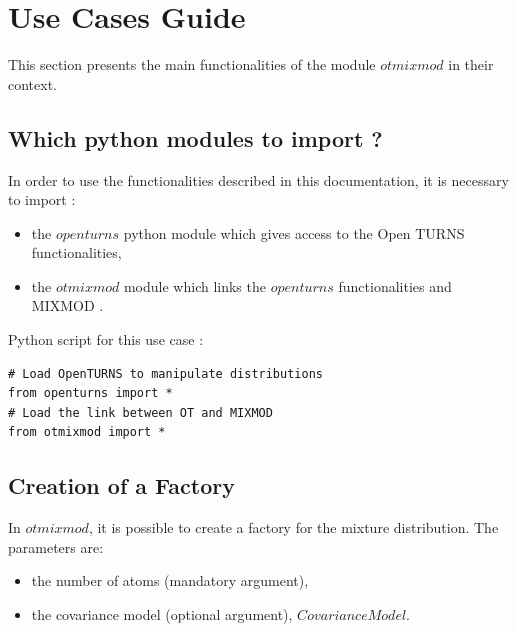 



\section{Use Cases Guide}

This section presents the main functionalities of the module $otmixmod$ in their context.



\subsection{Which python modules to import ?}

In order to use the functionalities described in this documentation, it is necessary to import  : 
\begin{itemize}
   \item the $openturns$ python module which gives access to the Open TURNS functionalities,
   \item the $otmixmod$ module which links the $openturns$ functionalities and MIXMOD .
\end{itemize}

Python  script for this use case :

\begin{lstlisting}
# Load OpenTURNS to manipulate distributions
from openturns import *
# Load the link between OT and MIXMOD
from otmixmod import *
\end{lstlisting}

\subsection{Creation of a Factory} \label{FactoryCreation}

In $otmixmod$, it is possible to create a factory for the mixture distribution. The parameters are:
\begin{itemize}
 \item the number of atoms (mandatory argument),
 \item the covariance model (optional argument), $CovarianceModel$.
\end{itemize}

